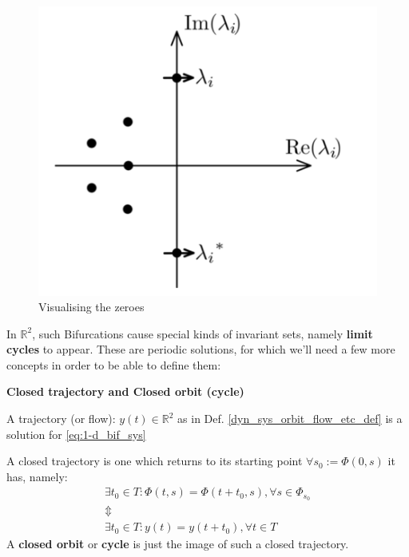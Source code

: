 \begin{figure}[H]
  \includegraphics[width=13cm]{math_pics/hopf-bif-eigenvalue-graph.png}
  \centering
  \caption{Visualising the zeroes}
\end{figure}

In $\mathbb{R}^2$, such Bifurcations cause special kinds of invariant sets, namely \textbf{limit cycles} to appear. These are periodic solutions, for which we'll need a few more concepts in order to be able to define them:
\begin{definition} \textbf{Closed trajectory and Closed orbit (cycle)}

  A trajectory (or flow): $y(t) \in \mathbb{R}^2$ as in Def. \ref{dyn_sys_orbit_flow_etc_def} is a solution for \ref{eq:1-d_bif_sys}

  A closed trajectory is one which returns to its starting point $\forall s_0 := \Phi(0,s) $ it has, namely:
  \begin{gather*}
    \exists t_0 \in T : \Phi(t,s) = \Phi(t+t_0,s), \forall s \in \Phi_{s_0}     \\
    \Updownarrow \\
    \exists t_0 \in T : y(t) = y(t+t_0), \forall t \in T
  \end{gather*}
  A \textbf{closed orbit} or \textbf{cycle} is just the image of such a closed trajectory.
\end{definition}

